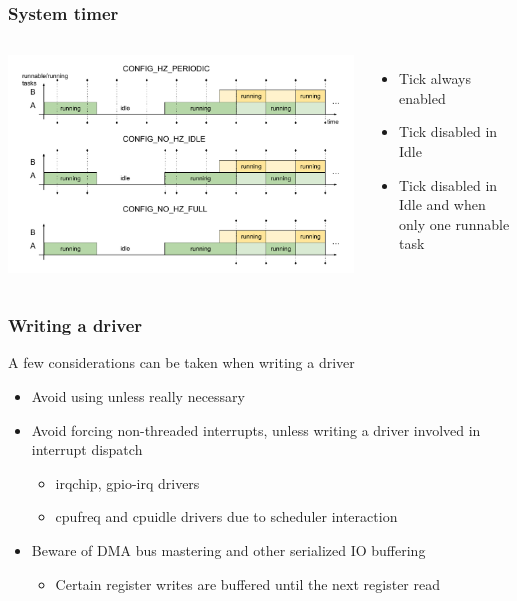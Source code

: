 \begin{frame}
	\frametitle{System timer}
	\begin{columns}
	\includegraphics[width=\textwidth]{slides/realtime-linux-configuration/hz.pdf}
		\begin{itemize}
			\item Tick always enabled \\
				\vspace{1.3cm}
			\item Tick disabled in Idle \\
				\vspace{1.3cm}
			\item Tick disabled in Idle and when only one runnable task
		\end{itemize}
	\end{columns}
\end{frame}



\begin{frame}
		\frametitle{Writing a driver}
A few considerations can be taken when writing a driver
		\begin{itemize}
			\item Avoid using  unless really necessary
			\item Avoid forcing non-threaded interrupts, unless writing a driver involved in interrupt dispatch
				\begin{itemize}
					\item irqchip, gpio-irq drivers
					\item cpufreq and cpuidle drivers due to scheduler interaction
				\end{itemize}
			\item Beware of DMA bus mastering and other serialized IO buffering
				\begin{itemize}
					\item Certain register writes are buffered until the next register read
				\end{itemize}
		\end{itemize}
\end{frame}
